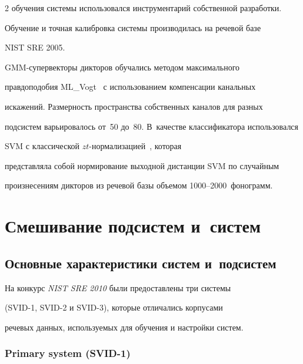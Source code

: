 \begin{multicols}{2}
обучения системы использовался инструментарий собственной разработки. 


Обучение и точная калибровка системы производилась на речевой базе 


{NIST SRE 2005}.


  





GMM-супервекторы дикторов обучались методом максимального 


правдоподобия ML\_Vogt~\cite{9b} с использованием компенсации канальных 


искажений. Размерность пространства собственных каналов для разных 


подсистем варьировалось от~50 до~80. В~качестве классификатора использовался 


SVM с классической $zt$-нор\-ма\-ли\-за\-ци\-ей~\cite{4b}, которая 


представляла собой нормирование выходной дистанции SVM по случайным 


произнесениям дикторов из речевой базы объемом 1000--2000~фонограмм.





\vspace*{-6pt}


  


\section{Смешивание подсистем и~систем}





\subsection{Основные характеристики систем и~подсистем} %





  На конкурс \textit{NIST SRE 2010} были предоставлены три системы 


(SVID-1, SVID-2 и SVID-3), которые отличались корпусами 


речевых данных, ис\-поль\-зу\-емых для обучения и настройки систем.


  


  \subsubsection{Primary system (SVID-1)}



\end{multicols}
